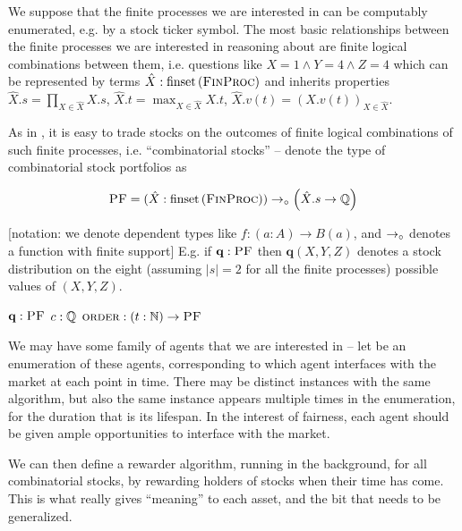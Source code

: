 \documentclass{article}
\begin{document}
We suppose that the finite processes we are interested in can be computably enumerated, e.g. by a stock ticker symbol. The most basic relationships between the finite processes we are interested in reasoning about are finite logical combinations between them, i.e. questions like $X=1\land Y=4\land Z=4$ which can be represented by terms $\hat{X}:\finset{\FinProc}$ and inherits properties $\hat{X}.s=\prod_{X\in\hat{X}}X.s$, $\hat{X}.t=\max_{X\in\hat{X}}X.t$, $\hat{X}.v(t)=(X.v(t))_{X\in\hat{X}}$.

As in \cite{hanson_combinatorial_2003, hanson_logarithmic_2002}, it is easy to trade stocks on the outcomes of finite logical combinations of such finite processes, i.e. ``combinatorial stocks'' -- denote the type of combinatorial stock portfolios as

\begin{equation*}
    \PF = (\hat{X}:\finset{\FinProc})\too \left(\hat{X}.s\to\Rats\right)
\end{equation*}

[notation: we denote dependent types like $f:(a:A)\to B(a)$, and $\to_\circ$ denotes a function with finite support] E.g. if $\mathbf{q}:\PF$ then $\mathbf{q}(X, Y, Z)$ denotes a stock distribution on the eight (assuming $|s|=2$ for all the finite processes) possible values of $(X, Y, Z)$.

\begin{algorithm}
\begin{algorithmic}
        \State $\mathbf{q} : \PF$ 
        \State $c : \mathbb{Q}$ 
        \State $\order:(t:\Nats)\to \PF$ 
    \EndClass
\end{algorithmic}
\end{algorithm}

We may have some family of agents that we are interested in -- let  be an enumeration of these agents, corresponding to which agent interfaces with the market at each point in time. There may be distinct \Agent instances with the same algorithm, but also the same instance appears multiple times in the enumeration, for the duration that is its lifespan. In the interest of fairness, each agent should be given ample opportunities to interface with the market.

We can then define a rewarder algorithm, running in the background, for all combinatorial stocks, by rewarding holders of stocks when their time has come. This is what really gives ``meaning'' to each asset, and the bit that needs to be generalized.
\end{document}
